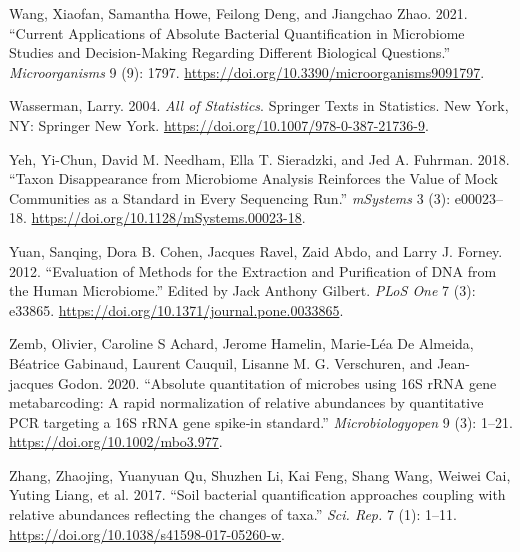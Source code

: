 \documentclass[
]{article}
\newlength{\cslhangindent}
\newlength{\cslentryspacingunit} %
\newenvironment{CSLReferences}[2] %
 {%
  \setlength{\parindent}{0pt}
  \ifodd #1
  \let\oldpar\par
  \def\par{\hangindent=\cslhangindent\oldpar}
  \fi
  \setlength{\parskip}{#2\cslentryspacingunit}
 }%
 {}
\begin{document}
\begin{CSLReferences}{1}{0}
\leavevmode{}%
Wang, Xiaofan, Samantha Howe, Feilong Deng, and Jiangchao Zhao. 2021. {``{Current Applications of Absolute Bacterial Quantification in Microbiome Studies and Decision-Making Regarding Different Biological Questions}.''} \emph{Microorganisms} 9 (9): 1797. \url{https://doi.org/10.3390/microorganisms9091797}.

\leavevmode{}%
Wasserman, Larry. 2004. \emph{{All of Statistics}}. Springer Texts in Statistics. New York, NY: Springer New York. \url{https://doi.org/10.1007/978-0-387-21736-9}.

\leavevmode{}%
Yeh, Yi-Chun, David M. Needham, Ella T. Sieradzki, and Jed A. Fuhrman. 2018. {``{Taxon Disappearance from Microbiome Analysis Reinforces the Value of Mock Communities as a Standard in Every Sequencing Run}.''} \emph{mSystems} 3 (3): e00023--18. \url{https://doi.org/10.1128/mSystems.00023-18}.

\leavevmode{}%
Yuan, Sanqing, Dora B. Cohen, Jacques Ravel, Zaid Abdo, and Larry J. Forney. 2012. {``{Evaluation of Methods for the Extraction and Purification of DNA from the Human Microbiome}.''} Edited by Jack Anthony Gilbert. \emph{PLoS One} 7 (3): e33865. \url{https://doi.org/10.1371/journal.pone.0033865}.

\leavevmode{}%
Zemb, Olivier, Caroline S Achard, Jerome Hamelin, Marie‐Léa De Almeida, Béatrice Gabinaud, Laurent Cauquil, Lisanne M. G. Verschuren, and Jean-jacques Godon. 2020. {``{Absolute quantitation of microbes using 16S rRNA gene metabarcoding: A rapid normalization of relative abundances by quantitative PCR targeting a 16S rRNA gene spike‐in standard}.''} \emph{Microbiologyopen} 9 (3): 1--21. \url{https://doi.org/10.1002/mbo3.977}.

\leavevmode{}%
Zhang, Zhaojing, Yuanyuan Qu, Shuzhen Li, Kai Feng, Shang Wang, Weiwei Cai, Yuting Liang, et al. 2017. {``{Soil bacterial quantification approaches coupling with relative abundances reflecting the changes of taxa}.''} \emph{Sci. Rep.} 7 (1): 1--11. \url{https://doi.org/10.1038/s41598-017-05260-w}.

\end{CSLReferences}
\end{document}
